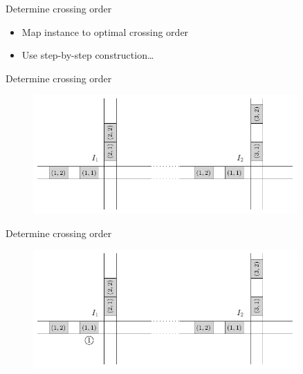 \documentclass[bigger]{beamer}
\begin{document}
\begin{frame}[label={sec:org6e24a98}]{Determine crossing order}

\vspace{12em}

\begin{itemize}
\item Map instance to optimal crossing order
\item Use step-by-step construction\ldots{}
\end{itemize}
\end{frame}
\begin{frame}[label={sec:org53b0d1c}]{Determine crossing order}
\begin{figure}
  \centering
  \includegraphics[width=0.9\textwidth]{figures/network_ordering-0.pdf}
\end{figure}
\end{frame}
\begin{frame}[label={sec:org04a3327}]{Determine crossing order}
\addtocounter{framenumber}{-1}
\begin{figure}
  \centering
  \includegraphics[width=0.9\textwidth]{figures/network_ordering-1.pdf}
\end{figure}
\end{frame}
\end{document}
